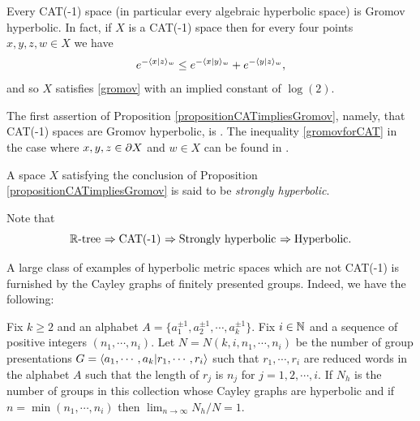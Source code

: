 \begin{proposition}
\label{propositionCATimpliesGromov}
Every CAT(-1) space (in particular every algebraic hyperbolic space) is Gromov hyperbolic. In fact, if $X$ is a CAT(-1) space then for every four points $x,y,z,w\in X$ we have 
\begin{equation}
\label{gromovforCAT}
e^{-\langle x|z\rangle_w} \leq e^{-\langle x|y\rangle_w} + e^{-\langle y|z\rangle_w},
\end{equation}
and so $X$ satisfies \eqref{gromov} with an implied constant of $\log(2)$.
\end{proposition}
\begin{remark}
The first assertion of Proposition \ref{propositionCATimpliesGromov}, namely, that CAT(-1) spaces are Gromov hyperbolic, is \cite[Proposition III.H.1.2]{BridsonHaefliger}. The inequality \eqref{gromovforCAT} in the case where $x,y,z\in\partial X$ and $w\in X$ can be found in \cite[Th\'eor\`eme 2.5.1]{Bourdon}.
\end{remark}

\begin{definition}
\label{definitionstronglyhyperbolic}
A space $X$ satisfying the conclusion of Proposition \ref{propositionCATimpliesGromov} is said to be \emph{strongly hyperbolic}.
\end{definition}
Note that
\[
\text{$\R$-tree \implies CAT(-1) \implies Strongly hyperbolic \implies Hyperbolic.}
\]

A large class of examples of hyperbolic metric spaces which are not CAT(-1) is furnished by the Cayley graphs of finitely presented groups. Indeed, we have the following:

\begin{theorem}
\label{theoremolshanskii}
Fix $k\geq 2$ and an alphabet $A = \{a_1^{\pm 1},a_2^{\pm 1},\cdots,a_k^{\pm 1}\}$. Fix $i\in\Namer$ and a sequence of positive integers $(n_1,\cdots,n_i)$. Let $N = N(k,i,n_1,\cdots,n_i)$ be the number of group presentations $G = \langle a_1,\cdots, a_k|r_1,\cdots,r_i\rangle$ such that $r_1,\cdots,r_i$ are reduced words in the alphabet $A$ such that the length of $r_j$ is $n_j$ for $j = 1,2,\cdots,i$. If $N_h$ is the number of groups in this collection whose Cayley graphs are hyperbolic and if $n = \min(n_1,\cdots,n_i)$ then $\lim_{n\to\infty}N_h/N = 1$.
\end{theorem}

